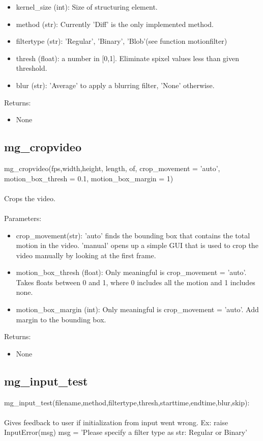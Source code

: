 \documentclass[9pt]{extarticle}
\begin{document}
    \begin{itemize}
    \item [] kernel\_size (int): Size of structuring element.
   \item [] method (str): Currently 'Diff' is the only implemented method. 
    \item [] filtertype (str): 'Regular', 'Binary', 'Blob'(see function motionfilter) 
    \item [] thresh (float): a number in [0,1]. Eliminate spixel values less than given threshold.
    \item [] blur (str): 'Average' to apply a blurring filter, 'None' otherwise.
    \end{itemize}
    Returns:
    \begin{itemize}
    \item [] None
    \end{itemize}


\subsection{mg\_cropvideo}

    mg\_cropvideo(fps,width,height, length, of, crop\_movement = 'auto', motion\_box\_thresh = 0.1, motion\_box\_margin = 1)
    \\\\
	Crops the video.\\\\
Parameters:
        \begin{itemize}
		\item [] crop\_movement(str): 'auto' finds the bounding box that contains the total motion in the video. 'manual' opens up a simple GUI that is used to crop the video manually by looking at the first frame.

		\item [] motion\_box\_thresh (float): Only meaningful is crop\_movement = 'auto'. Takes floats between 0 and 1, where 0 includes all the motion and 1 includes none.
		
		\item [] motion\_box\_margin (int): Only meaningful is crop\_movement = 'auto'. Add margin to the bounding box.
        \end{itemize}
	Returns:
    \begin{itemize}
	   \item [] None
    \end{itemize}


\subsection{mg\_input\_test}
    mg\_input\_test(filename,method,filtertype,thresh,starttime,endtime,blur,skip): 
    \\\\
    Gives feedback to user if initialization from input went wrong.
    Ex: raise InputError(msg)
    msg = 'Please specify a filter type as str: Regular or Binary'
\end{document}
